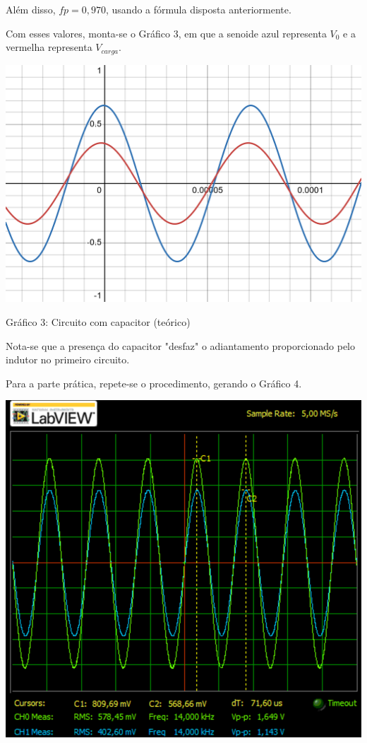 \documentclass[a4 paper]{article}
\begin{document}
Além disso, $fp=0,970$, usando a fórmula disposta anteriormente.

Com esses valores, monta-se o Gráfico 3, em que a senoide azul representa $V_0$ e a vermelha representa $V_{carga}$.

\newpage
\vspace{3cm}
\begin{table}[h]
\centering
\includegraphics[scale=0.25]{rgadicoas/grafico2}
\end{table}

\begin{center}
Gráfico 3: Circuito com capacitor (teórico)
\end{center}

Nota-se que a presença do capacitor "desfaz" o adiantamento proporcionado pelo indutor no primeiro circuito.

Para a parte prática, repete-se o procedimento, gerando o Gráfico 4.


\begin{table}[h]
\centering
\includegraphics[scale=0.25]{rgadicoas/rgadicoa2}
\end{table}
\end{document}
